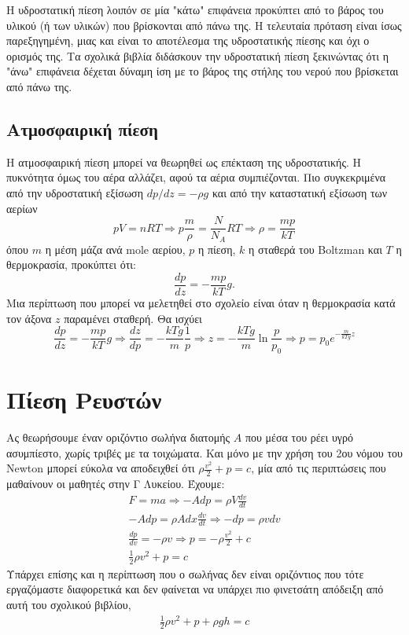 \documentclass[12pt,titlepage]{article}
\begin{document}
Η υδροστατική πίεση λοιπόν σε μία "κάτω" επιφάνεια προκύπτει από το βάρος του υλικού (ή των υλικών) που βρίσκονται από πάνω της. Η τελευταία πρόταση είναι ίσως παρεξηγημένη, μιας και είναι το αποτέλεσμα της υδροστατικής πίεσης και όχι ο ορισμός της. Τα σχολικά βιβλία διδάσκουν την υδροστατική πίεση ξεκινώντας ότι η "άνω" επιφάνεια δέχεται δύναμη ίση με το βάρος της στήλης του νερού που βρίσκεται από πάνω της.
\subsection{Ατμοσφαιρική πίεση}
Η ατμοσφαιρική πίεση μπορεί να θεωρηθεί ως επέκταση της υδροστατικής. Η πυκνότητα όμως του αέρα αλλάζει, αφού τα αέρια συμπιέζονται. Πιο συγκεκριμένα από την υδροστατική εξίσωση $dp/dz=-ρg$ και από την καταστατική εξίσωση των αερίων
$$pV=nRT \Rightarrow p\frac{m}{ρ}=\frac{N}{N_A}RT \Rightarrow ρ=\frac{mp}{kT}$$
όπου $m$ η μέση μάζα ανά mole αερίου, $p$ η πίεση, $k$ η σταθερά του Boltzman και $T$ η θερμοκρασία, προκύπτει ότι:
\begin{equation*}
 \frac{dp}{dz}=-\frac{mp}{kT}g.
\end{equation*}
Μια περίπτωση που μπορεί να μελετηθεί στο σχολείο είναι όταν η θερμοκρασία κατά τον άξονα $z$ παραμένει σταθερή. Θα ισχύει
\begin{equation} \label{eq:16}
 \frac{dp}{dz}=-\frac{mp}{kT}g \Rightarrow \frac{dz}{dp}=-\frac{kTg}{m}\frac{1}{p} \Rightarrow z=-\frac{kTg}{m}\ln \frac{p}{p_0} \Rightarrow p=p_0e^{-\frac{m}{kTg}z}
\end{equation}

\section{Πίεση Ρευστών}
Ας θεωρήσουμε έναν οριζόντιο σωλήνα διατομής $A$ που μέσα του ρέει υγρό ασυμπίεστο, χωρίς τριβές με τα τοιχώματα. Και μόνο με την χρήση του 2ου νόμου του Newton μπορεί εύκολα να αποδειχθεί ότι $ρ\frac{v^2}{2}+p=c$, μία από τις περιπτώσεις που μαθαίνουν οι μαθητές στην Γ Λυκείου. Έχουμε:
\begin{gather*}
 F=ma \Rightarrow -Adp=ρV\frac{dv}{dt} \\
 -Adp=ρAdx\frac{dv}{dt} \Rightarrow -dp=ρv dv \\
 \frac{dp}{dv}=-ρv \Rightarrow p=-ρ\frac{v^2}{2}+c \\
 \frac{1}{2}ρv^2+p=c
\end{gather*}
Υπάρχει επίσης και η περίπτωση που ο σωλήνας δεν είναι οριζόντιος που τότε εργαζόμαστε διαφορετικά και δεν φαίνεται να υπάρχει πιο φινετσάτη απόδειξη από αυτή του σχολικού βιβλίου,
\begin{gather*}
 \frac{1}{2}ρv^2+p+ρgh=c
\end{gather*}
\end{document}
